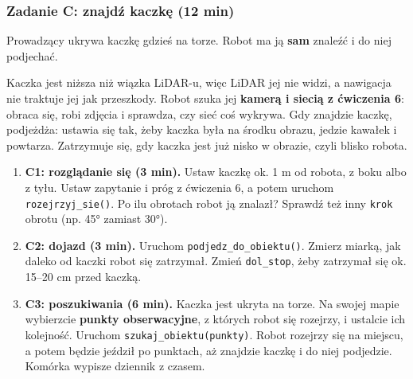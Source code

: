 \subsubsection{Zadanie C: znajdź kaczkę (12 min)}\label{zadanie-c-znajdux17a-kaczkux119-12-min}

Prowadzący ukrywa kaczkę gdzieś na torze. Robot ma ją \textbf{sam} znaleźć i do niej podjechać.

Kaczka jest niższa niż wiązka LiDAR-u, więc LiDAR jej nie widzi, a nawigacja nie traktuje jej jak przeszkody. Robot szuka jej \textbf{kamerą i siecią z ćwiczenia 6}: obraca się, robi zdjęcia i sprawdza, czy sieć coś wykrywa. Gdy znajdzie kaczkę, podjeżdża: ustawia się tak, żeby kaczka była na środku obrazu, jedzie kawałek i powtarza. Zatrzymuje się, gdy kaczka jest już nisko w obrazie, czyli blisko robota.

\begin{enumerate}
\def\labelenumi{\arabic{enumi}.}
\tightlist
\item
  \textbf{C1: rozglądanie się (3 min).} Ustaw kaczkę ok. 1 m od robota, z boku albo z tyłu. Ustaw zapytanie i próg z ćwiczenia 6, a potem uruchom \texttt{rozejrzyj\_sie()}. Po ilu obrotach robot ją znalazł? Sprawdź też inny \texttt{krok} obrotu (np. 45° zamiast 30°).
\item
  \textbf{C2: dojazd (3 min).} Uruchom \texttt{podjedz\_do\_obiektu()}. Zmierz miarką, jak daleko od kaczki robot się zatrzymał. Zmień \texttt{dol\_stop}, żeby zatrzymał się ok. 15--20 cm przed kaczką.
\item
  \textbf{C3: poszukiwania (6 min).} Kaczka jest ukryta na torze. Na swojej mapie wybierzcie \textbf{punkty obserwacyjne}, z których robot się rozejrzy, i ustalcie ich kolejność. Uruchom \texttt{szukaj\_obiektu(punkty)}. Robot rozejrzy się na miejscu, a potem będzie jeździł po punktach, aż znajdzie kaczkę i do niej podjedzie. Komórka wypisze dziennik z czasem.
\end{enumerate}

